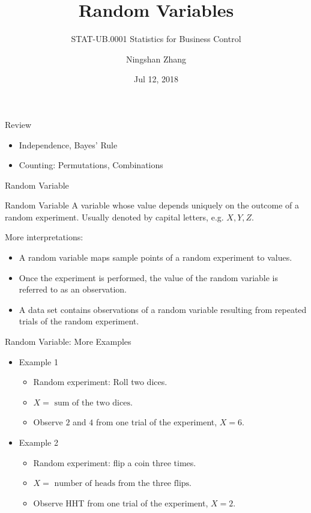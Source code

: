 \documentclass{beamer}
\title{Random Variables}
\subtitle{STAT-UB.0001 Statistics for Business Control}
\author{Ningshan Zhang}
\institute[New York University] %
{
  IOMS Department\\
  nzhang@stern.nyu.edu
  \let\thefootnote\relax\footnotetext{\tiny{*  Office Hours: Wed \& Fri 10:00 - 11:30 AM, KMC 8-174}}
}
\date{Jul 12, 2018}
\begin{document}
\begin{frame}
  \titlepage
\end{frame}



\begin{frame}{Review}
\begin{itemize}
\item Independence, Bayes' Rule
\item Counting: Permutations, Combinations
\end{itemize}
\end{frame}

\begin{frame}{Random Variable}
    \begin{block}{Random Variable}
        A variable whose value depends uniquely on the outcome of a random experiment. 
        Usually denoted by capital letters, e.g. $X,Y,Z$.
    \end{block}

    More interpretations:
\begin{itemize}
\item A random variable maps sample points of a random experiment to values. 
\item Once the experiment is performed, the value of the random variable is referred to as an \alert{observation}. 
\item A data set contains observations of a random variable resulting from repeated trials of the random experiment.
\end{itemize}
\end{frame}


\begin{frame}{Random Variable: More Examples}
\begin{itemize}
\item Example 1
\begin{itemize}
\item Random experiment: Roll two dices.
\item $X = \text{ sum of the two dices}$.
\item Observe $2$ and $4$ from one trial of the experiment, $X=6$.
\end{itemize}
\item Example 2
\begin{itemize}
\item Random experiment: flip a coin three times.
\item $X = \text{ number of heads from the three flips}$.
\item Observe HHT from one trial of the experiment, $X=2$.
\end{itemize}
\end{itemize}
\end{frame}
\end{document}
